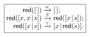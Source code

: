 \documentclass[11pt]{article}
\begin{document}
\TeXtoEPS
\(
\boxed{
\begin{array}{@{}r@{\;}c@{\;}l@{}}
          \fun{red}(\el) & \xrightarrow{\smash{\alpha}} & \el;\\
\fun{red}(\cons{x,x}{s}) & \xrightarrow{\smash{\beta}}  & \fun{red}(\cons{x}{s});\\
\fun{red}(\cons{x}{s})   & \xrightarrow{\smash{\gamma}} & \cons{x}{\fun{red}(s)}.
\end{array}}
\)
\endTeXtoEPS
\end{document}
